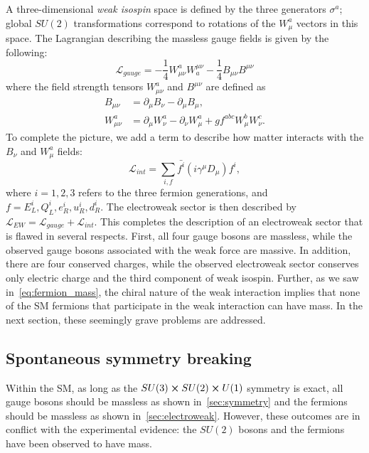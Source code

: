 A three-dimensional \emph{weak isospin} space is defined by the three generators
$\sigma^a$; global $SU(2)$ transformations correspond to rotations of the
$W_\mu^a$ vectors in this space. The Lagrangian describing the massless gauge
fields is given by the following:
\begin{equation}
  \mathcal{L}_{gauge} = - \frac{1}{4} W^a_{\mu\nu} W_a^{\mu\nu}
  - \frac{1}{4}B_{\mu\nu}B^{\mu\nu}
\end{equation}
where the field strength tensors $W^a_{\mu\nu}$ and $B^{\mu\nu}$ are defined as
\begin{align}
  B_{\mu\nu} &= \partial_\mu B_\nu - \partial_\mu B_\mu, \\
W^a_{\mu\nu} &= \partial_\mu W_\nu^a - \partial_\nu W_\mu^a + g f^{abc}W^b_\mu W^c_\nu.
\end{align}
To complete the picture, we add a term to describe how matter interacts with the $B_\nu$ and $W_\mu^a$ fields:
\begin{equation}
  \mathcal{L}_{int} = \sum_{i,f}\bar{f^i}(i\gamma^\mu D_\mu)f^i,
\end{equation}
where $i=1,2,3$ refers to the three fermion generations, and $f=E^i_L, Q^i_L, e^i_R, u^i_R, d^i_R$. The electroweak sector is then described by $\mathcal{L}_{EW} = \mathcal{L}_{gauge} + \mathcal{L}_{int}$. This completes the description of an electroweak sector that is flawed in several respects. First, all four gauge bosons are massless, while the observed gauge bosons associated with the weak force are massive. In addition, there are four conserved charges, while the observed electroweak sector conserves only electric charge and the third component of weak isospin. Further, as we saw in~\cref{eq:fermion_mass}, the chiral nature of the weak interaction implies that none of the SM fermions that participate in the weak interaction can have mass. In the next section, these seemingly grave problems are addressed.

\subsection{Spontaneous symmetry breaking}
\label{ssec:SSB}
Within the SM, as long as the $SU(3) \cross SU(2) \cross U(1)$ symmetry is exact, all gauge bosons should be massless as shown in~\cref{sec:symmetry} and the fermions should be massless as shown in~\cref{sec:electroweak}. However, these outcomes are in conflict with the experimental evidence: the $SU(2)$ bosons and the fermions have been observed to have mass.

